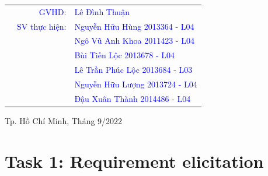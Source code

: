 \documentclass[a4paper]{article}
\begin{document}
\begin{titlepage}
\begin{table}[h]
\begin{tabular}{rrl}

\hspace{5 cm} &\textcolor{blue}{ GVHD}: & \textcolor{blue}{Lê Đình Thuận}\\

& \textcolor{blue}{SV thực hiện}: & \textcolor{blue}{Nguyễn Hữu Hùng \hspace{6.5mm}2013364 - L04} \\
& &\textcolor{blue}{Ngô Vũ Anh Khoa  \hspace{6.5mm}2011423 - L04} \\
& & \textcolor{blue}{Bùi Tiến Lộc \hspace{15mm}2013678 - L04}  \\
& &\textcolor{blue}{Lê Trần Phúc Lộc  \hspace{7.5mm}2013684 - L03} \\
& & \textcolor{blue}{Nguyễn Hữu Lượng \hspace{5.5mm}2013724 - L04} \\
& &\textcolor{blue}{Đậu Xuân Thành  \hspace{8.5mm}2014486 - L04}  \\

\end{tabular}
\end{table}
\vspace{5cm}
\begin{center}
{\footnotesize Tp. Hồ Chí Minh, Tháng 9/2022}
\end{center}
\end{titlepage}



\newpage
\tableofcontents
\newpage
\section{Task 1: Requirement elicitation}
\end{document}
